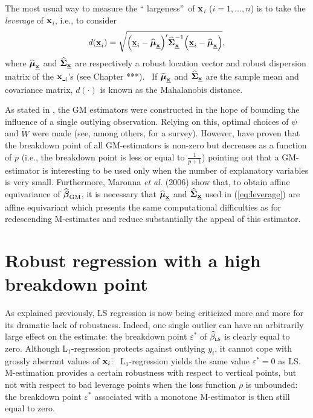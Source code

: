 The most usual way to measure the \textquotedblleft
largeness\textquotedblright\ of \underline{$\mathbf x$}$_{i}$ ($i=1,\ldots
,n$) is to take the \emph{leverage} of \underline{$\mathbf x$}$_{i}$, i.e.,
to consider%
\begin{equation}
d(\underline{\stvec{x}}_{i})=\sqrt{\left(  \underline{\stvec{x}}%
_{i}-\sthat{\boldsymbol{\mu}}_{\underline{\stvec{x}}}\right)  ^{\prime
}\sthat{\boldsymbol{\Sigma}}_{\underline{\stvec{x}}}^{-1}\left(
\underline{\stvec{x}}_{i}-\sthat{\boldsymbol{\mu}}_{\underline{\stvec{x}}%
}\right)  }, \label{eq:leverage}%
\end{equation}
where $\widehat{\boldsymbol{\mu}}_{\underline{\mathbf x}}$ and $\widehat
{\boldsymbol{\Sigma}}_{\underline{\mathbf x}}$ are respectively a robust
location vector and robust dispersion matrix of the \underline{$\mathbf x$%
}$_{i}$'s (see Chapter ***). \ If $\widehat{\boldsymbol{\mu}}_{\underline
{\mathbf x}}$ and $\widehat{\boldsymbol{\Sigma}}_{\underline{\mathbf x}}$
are the sample mean and covariance matrix, $d\left(  \cdot\right)  $ is known
as the Mahalanobis distance.

As stated in \citet{rousseeuw:leroy:1987}, the GM estimators were constructed
in the hope of bounding the influence of a single outlying observation.
Relying on this, optimal choices of $\psi$ and $\widetilde{W}$ were made (see,
among others, \citealp{Ronchetti:Rousseeuw:1985} for a survey). However,
\citet{Maronna:1979} have proven that the breakdown point of all
GM-estimators is non-zero but decreases as a function of $p$ (i.e., the
breakdown point is less or equal to $\frac{1}{p+1}$) pointing out that a
GM-estimator is interesting to be used only when the number of explanatory
variables is very small. Furthermore, Maronna \textit{et al.} (2006) show
that, to obtain affine equivariance of $\sthat{\boldsymbol\beta%
}_{\mathrm{GM}}$, it is necessary that $\sthat{\boldsymbol{\mu}}%
_{\underline{\stvec{x}}}$ and $\widehat{\boldsymbol{\Sigma}}_{\underline
{\mathbf x}}$ used in (\ref{eq:leverage}) are affine equivariant which
presents the same computational difficulties as for redescending M-estimates
and reduce substantially the appeal of this estimator.

\section{Robust regression with a high breakdown point}

As explained previously, LS regression is now being criticized more and more
for its dramatic lack of robustness. Indeed, one single outlier can have an
arbitrarily large effect on the estimate: the breakdown point $\varepsilon
^{\ast}$ of $\sthat{\beta}_{\stsc{LS}}$ is clearly equal to zero. Although
L$_{1}$-regression protects against outlying $y_{i}$, it cannot cope with
grossly aberrant values of $\mathbf x_{i}$: \ L$_{1}$-regression yields the
same value $\varepsilon^{\ast}=0$ as LS. M-estimation provides a certain
robustness with respect to vertical points, but not with respect to bad
leverage points when the loss function $\rho$ is unbounded: the breakdown
point $\varepsilon^{\ast}$ associated with a monotone M-estimator is then
still equal to zero.

